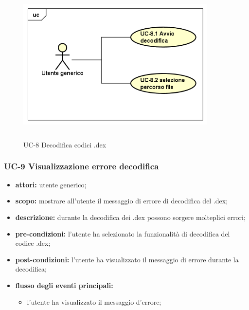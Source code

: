 \begin{figure}[!h]
    \centering
    \includegraphics[width=10cm, height=8cm]{./immagini/usecase/uc_8.png}
    \caption{UC-8 Decodifica codici .dex}
\end{figure}



\subsubsection{UC-9 Visualizzazione errore decodifica}\label{subsubsec:uc-9-visualizzazione-errore-decodifica}
\begin{itemize}
    \item \textbf{attori:} utente generico;
    \item \textbf{scopo:} mostrare all'utente il messaggio di errore di decodifica del .dex;
    \item \textbf{descrizione:} durante la decodifica dei .dex possono sorgere molteplici errori;
    \item \textbf{pre-condizioni:} l'utente ha selezionato la funzionalità di decodifica del codice .dex;
    \item \textbf{post-condizioni:} l'utente ha visualizzato il messaggio di errore durante la decodifica;
    \item \textbf{flusso degli eventi principali:}
    \begin{itemize}
        \item l'utente ha visualizzato il messaggio d'errore;
    \end{itemize}
\end{itemize}

